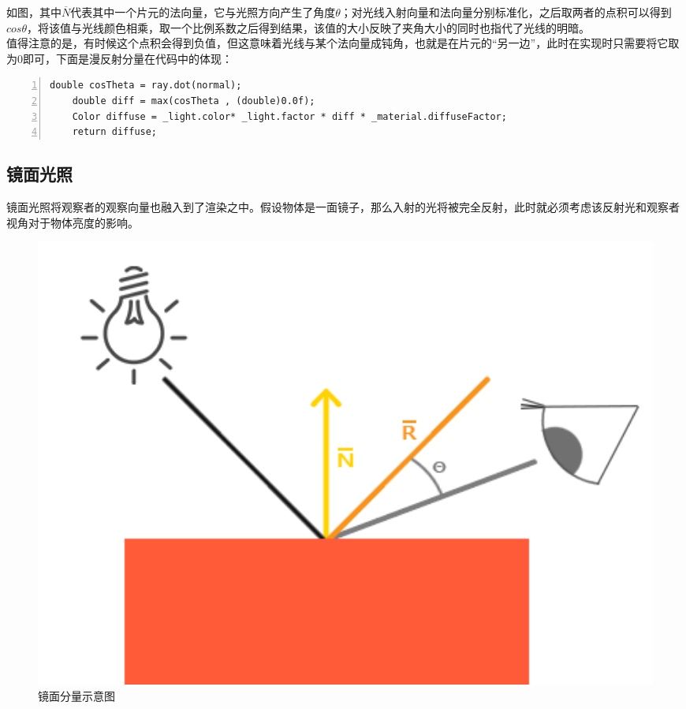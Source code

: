 \begin{spacing}{2.5}
	如图，其中$\overline N$代表其中一个片元的法向量，它与光照方向产生了角度$\theta$；对光线入射向量和法向量分别标准化，之后取两者的点积可以得到$cos\theta$，将该值与光线颜色相乘，取一个比例系数之后得到结果，该值的大小反映了夹角大小的同时也指代了光线的明暗。\\
	值得注意的是，有时候这个点积会得到负值，但这意味着光线与某个法向量成钝角，也就是在片元的“另一边”，此时在实现时只需要将它取为0即可，下面是漫反射分量在代码中的体现：
	
	\begin{lstlisting}[language={[ANSI]C},numbers=left,numberstyle=\tiny,%frame=shadowbox,
   rulesepcolor=\color{red!20!green!20!blue!20},
   keywordstyle=\color{blue!70!black},
   commentstyle=\color{blue!90!},
   basicstyle=\ttfamily]
	double cosTheta = ray.dot(normal);
    double diff = max(cosTheta , (double)0.0f);
    Color diffuse = _light.color* _light.factor * diff * _material.diffuseFactor;
    return diffuse;
	\end{lstlisting}
	
	\subsection{镜面光照}
	
	镜面光照将观察者的观察向量也融入到了渲染之中。假设物体是一面镜子，那么入射的光将被完全反射，此时就必须考虑该反射光和观察者视角对于物体亮度的影响。
	
    \begin{figure}[H]
    	\centering
		\includegraphics[width=1.0\textwidth]{images/specular_light.png}
		\caption{镜面分量示意图}
		\label{specular_light}
    \end{figure}
    

\end{spacing}
